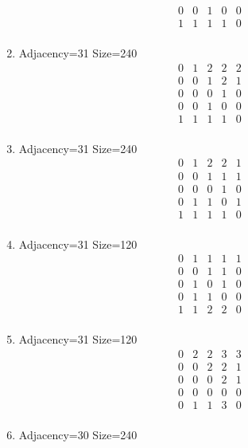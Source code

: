 \documentclass[12pt]{article}
\begin{document}
\begin{multicols}{3}
\begin{enumerate}
\begin{equation*}
\begin{array}{ccccc}
0&0&1&0&0\\
1&1&1&1&0\\
\end{array}
\end{equation*}
\item Adjacency=31 Size=240
\begin{equation*}
\begin{array}{ccccc}
0&1&2&2&2\\
0&0&1&2&1\\
0&0&0&1&0\\
0&0&1&0&0\\
1&1&1&1&0\\
\end{array}
\end{equation*}
\item Adjacency=31 Size=240
\begin{equation*}
\begin{array}{ccccc}
0&1&2&2&1\\
0&0&1&1&1\\
0&0&0&1&0\\
0&1&1&0&1\\
1&1&1&1&0\\
\end{array}
\end{equation*}
\item Adjacency=31 Size=120
\begin{equation*}
\begin{array}{ccccc}
0&1&1&1&1\\
0&0&1&1&0\\
0&1&0&1&0\\
0&1&1&0&0\\
1&1&2&2&0\\
\end{array}
\end{equation*}
\item Adjacency=31 Size=120
\begin{equation*}
\begin{array}{ccccc}
0&2&2&3&3\\
0&0&2&2&1\\
0&0&0&2&1\\
0&0&0&0&0\\
0&1&1&3&0\\
\end{array}
\end{equation*}
\item Adjacency=30 Size=240
\begin{equation*}
\begin{array}{ccccc}

\end{array}
\end{equation*}
\end{enumerate}
\end{multicols}
\end{document}
